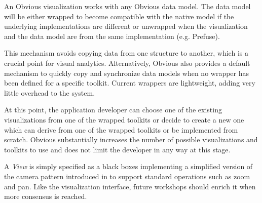 
An Obvious visualization works with any Obvious data model.  The data
model will be either wrapped to become compatible with the native
model if the underlying implementations are different or unwrapped
when the visualization and the data model are from the same
implementation (e.g. Prefuse).

This mechanism avoids copying data from one structure to another,
which is a crucial point for visual analytics.  Alternatively, Obvious
also provides a default mechanism to quickly copy and synchronize data
models when no wrapper has been defined for a specific toolkit.
Current wrappers are lightweight, adding very little overhead to the
system.

At this point, the application developer can choose one of the
existing visualizations from one of the wrapped toolkits or decide to
create a new one which can derive from one of the wrapped toolkits or
be implemented from scratch.  Obvious substantially increases the
number of possible visualizations and toolkits to use and does not
limit the developer in any way at this stage.

A \emph{View} is simply specified as a black boxes implementing a
simplified version of the camera pattern introduced in
\cite{DesignPatternsIV} to support standard operations such as zoom
and pan.  Like the visualization interface, future workshops should
enrich it when more consensus is reached.

